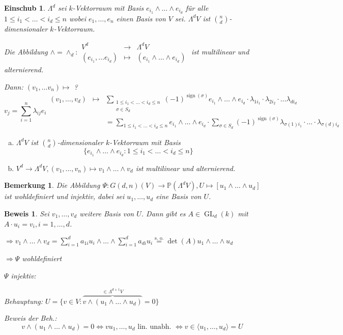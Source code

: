 \documentclass[a4paper, 12pt, numbers=noendperiod, chapterprefix=true]{scrbook}
\theoremstyle{break}
\newtheorem{Bem}[Def]{Bemerkung}
\newtheorem{Einsch}[Def]{Einschub}
\theoremstyle{nonumberbreak}
\newtheorem{Bew}{Beweis}
\theoremstyle{nonumberplain}
\newcommand{\Sum}{\sum\limits}
\DeclareMathOperator{\GL}{GL}
\DeclareMathOperator{\sign}{sign}
\newcommand{\IP}{\mathbb{P}}%
\begin{document}
\begin{Einsch}
$\Lambda^d$ sei $k$-Vektorraum mit Basis $e_{i_1}\wedge\ldots \wedge e_{i_d}$ f\"ur alle $1\le i_1 < \ldots < i_d \le n$ wobei $e_1,\ldots ,e_n$ einen Basis von $V$ sei. $\Lambda^dV$ ist $\binom{n}{d}$-dimensionaler $k$-Vektorraum.

Die Abbildung $\wedge=\wedge_d:\begin{array}{rcl} V^d &\to& \Lambda^dV\\ (e_{i_1},\ldots e_{i_d}) &\mapsto& (e_{i_1}\wedge\ldots \wedge e_{i_d})\end{array}$ ist multilinear und alternierend.\

\emph{Dann}: $(v_1,\ldots v_n)\mapsto$ ?
	\[v_j=\Sum_{i=1}^n\lambda_{ij}e_i
	\begin{array}{rcl}
		(v_1,\ldots ,v_d)&\mapsto& \Sum_{\substack{1\le i_1<\ldots <i_d\le n\\\sigma \in S_d}}(-1)^{\sign(\sigma)}e_{i_1}\wedge\ldots \wedge e_{i_d}\cdot \lambda_{1i_1}\cdot \lambda_{2i_2}\cdot\ldots \lambda_{di_d} \\
		&&= \Sum_{1\le i_1 <\ldots <i_d\le n} e_{i_1}\wedge\ldots \wedge e_{i_d}\cdot \Sum_{\sigma \in S_d}(-1)^{\sign(\sigma)}\lambda_{\sigma(1)i_1}\cdot \ldots \cdot \lambda_{\sigma(d)i_d}
	\end{array}\]
\begin{enumerate}[a)]

\item
	$\Lambda^dV$ ist $\binom{n}{d}$-dimensionaler $k$-Vektorraum mit Basis
		\[\{  e_{i_1}\wedge\ldots \wedge e_{i_d} : 1\le i_1 <\ldots <i_d\le n \}\]
\item
	$V^d\to \Lambda^dV, (v_1,\ldots ,v_n)\mapsto v_1\wedge\ldots \wedge v_d$ ist multilinear und alternierend.
\end{enumerate}\end{Einsch}

\begin{Bem}
Die Abbildung $\Psi:G(d,n)(V)\to \IP(\Lambda^dV), U\mapsto [u_1\wedge\ldots \wedge u_d]$ ist wohldefiniert und injektiv, dabei sei $u_1,\ldots ,u_d$ eine Basis von $U$.
\end{Bem}

\begin{Bew}
Sei $v_1,\ldots ,v_d$ weitere Basis von $U$. Dann gibt es $A\in \GL_d(k)$ mit $A\cdot u_i = v_i, i=1,\ldots ,d$.

$\Rightarrow v_1\wedge\ldots \wedge v_d = \Sum_{i=1}^da_{1i}u_i\wedge\ldots  \wedge \Sum_{i=1}^d a_{di}u_i \overset{\text{s. o.}}{=} \det(A) u_1\wedge \ldots \wedge u_d$

$\Rightarrow \Psi$ wohldefiniert

\emph{$\Psi$ injektiv}:

\emph{Behauptung:} $U=\{v\in V : \overbrace{v\wedge(u_1\wedge\ldots \wedge u_d)}^{\in \Lambda^{d+1}V}=0\}$

\emph{Beweis der Beh.:}
	\[v\wedge(u_1\wedge\ldots \wedge u_d)=0\Leftrightarrow vu_1,\ldots ,u_d \text{ lin. unabh. } \Leftrightarrow v\in \langle u_1,\ldots ,u_d\rangle =U\]
\end{Bew}
\end{document}
